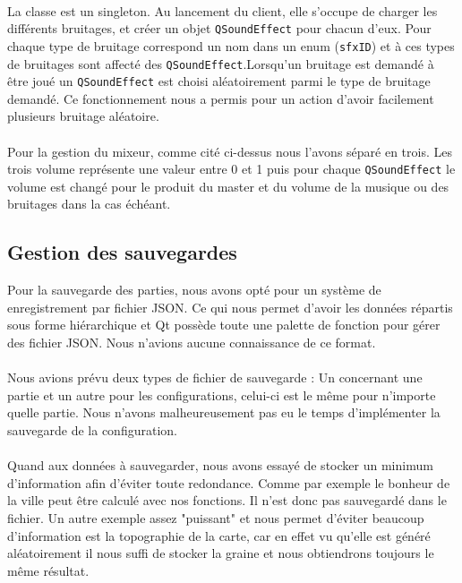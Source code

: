 \documentclass[a4paper,10pt,openany,oneside]{report}
\begin{document}
\paragraph{}
La classe est un singleton. Au lancement du client, elle s'occupe de charger les différents bruitages, et créer un objet \texttt{QSoundEffect} pour chacun d'eux. Pour chaque type de bruitage correspond un nom dans un enum (\texttt{sfxID}) et à ces types de bruitages sont affecté des \texttt{QSoundEffect}.Lorsqu'un bruitage est demandé à être joué un \texttt{QSoundEffect} est choisi aléatoirement parmi le type de bruitage demandé. Ce fonctionnement nous a permis pour un action d'avoir facilement plusieurs bruitage aléatoire.
\paragraph{}
Pour la gestion du mixeur, comme cité ci-dessus nous l'avons séparé en trois. Les trois volume représente une valeur entre 0 et 1 puis pour chaque \texttt{QSoundEffect} le volume est changé pour le produit du master et du volume de la musique ou des bruitages dans la cas échéant.
\subsection{Gestion des sauvegardes}
Pour la sauvegarde des parties, nous avons opté pour un système de enregistrement par fichier JSON. Ce qui nous permet d'avoir les données répartis sous forme hiérarchique et Qt possède toute une palette de fonction pour gérer des fichier JSON. Nous n'avions aucune connaissance de ce format.
\paragraph{}
Nous avions prévu deux types de fichier de sauvegarde : Un concernant une partie et un autre pour les configurations, celui-ci est le même pour n'importe quelle partie. Nous n'avons malheureusement pas eu le temps d'implémenter la sauvegarde de la configuration.
\paragraph{}
Quand aux données à sauvegarder, nous avons essayé de stocker un minimum d'information afin d'éviter toute redondance. Comme par exemple le bonheur de la ville peut être calculé avec nos fonctions. Il n'est donc pas sauvegardé dans le fichier. Un autre exemple assez "puissant" et nous permet d'éviter beaucoup d'information est la topographie de la carte, car en effet vu qu'elle est généré aléatoirement il nous suffi de stocker la graine et nous obtiendrons toujours le même résultat.
\end{document}
